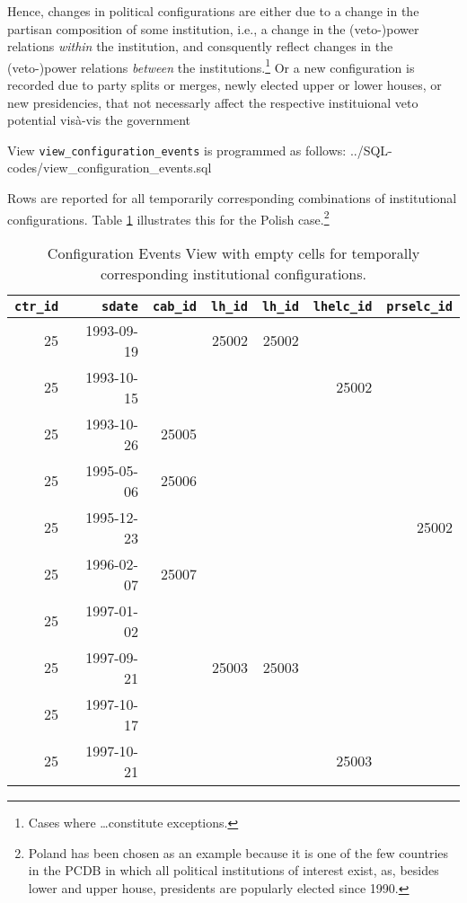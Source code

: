 Hence, changes in political configurations are either due to a change in the partisan composition of some institution, i.e., a change in the (veto-)power relations \emph{within} the institution, and consquently reflect changes in the (veto-)power relations \emph{between} the institutions.\footnote{Cases where \ldots constitute exceptions.}
Or a new configuration is recorded due to party splits or merges, newly elected upper or lower houses, or new presidencies, that not necessarly affect the respective instituional veto potential vis\`a-vis the government

View \texttt{view\_configuration\_events} is programmed as follows:
%
{../SQL-codes/view_configuration_events.sql}

Rows are reported for all temporarily corresponding combinations of institutional configurations. 
Table \ref{tab_view_config_events_empty_cells}  illustrates this for the Polish case.\footnote{%
Poland has been chosen as an example because it is one of the few countries in the PCDB in which all political institutions of interest exist, as, besides lower and upper house, presidents are popularly elected since 1990.}

\begin{table}[h!]
\centering\footnotesize
\caption{Configuration Events View with empty cells for temporally corresponding institutional configurations.}
\label{tab_view_config_events_empty_cells}
\begin{tabular}{r r r r r r r}
\tabularnewline\toprule\toprule
\multicolumn{1}{r}{\texttt{ctr\_id}}	&
\multicolumn{1}{r}{\texttt{sdate}}	&	
\multicolumn{1}{r}{\texttt{cab\_id}}	&
\multicolumn{1}{r}{\texttt{lh\_id}}	&
\multicolumn{1}{r}{\texttt{lh\_id}}	&	
\multicolumn{1}{r}{\texttt{lhelc\_id}}	&	
\multicolumn{1}{r}{\texttt{prselc\_id}}	\\\midrule
25	&	1993-09-19	&		&	25002	&	25002	&		&		\\
25	&	1993-10-15	&		&		&		&	25002	&		\\
25	&	1993-10-26	&	25005	&		&		&		&		\\
25	&	1995-05-06	&	25006	&		&		&		&		\\
25	&	1995-12-23	&		&		&		&		&	25002	\\
25	&	1996-02-07	&	25007	&		&		&		&		\\
25	&	1997-01-02	&		&		&		&		&		\\
25	&	1997-09-21	&		&	25003	&	25003	&		&		\\
25	&	1997-10-17	&		&		&		&		&		\\
25	&	1997-10-21	&		&		&		&	25003	&		\\\bottomrule\bottomrule
\end{tabular}
\end{table}

